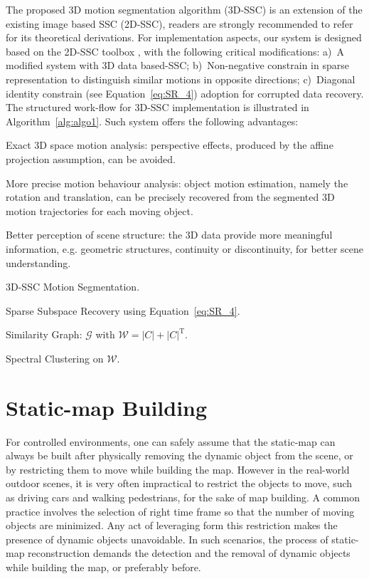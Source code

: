 \documentclass[10pt,twocolumn,letterpaper]{article}  %
\begin{document}
The proposed 3D motion segmentation algorithm (3D-SSC) is an extension of the existing image based SSC (2D-SSC), readers are strongly recommended to refer \cite{c2} for its theoretical derivations. For implementation aspects, our system is designed based on the 2D-SSC toolbox \cite{c2}, with the following critical modifications: a)~A modified system with 3D data based-SSC; b)~Non-negative constrain in sparse representation to distinguish similar motions in opposite directions; c)~Diagonal identity constrain (see Equation~\eqref{eq:SR_4}) adoption for corrupted data recovery. The structured work-flow for 3D-SSC implementation is illustrated in Algorithm~\ref{alg:algo1}. Such system offers the following advantages: 
\begin{list}{}{\leftmargin=1em}
\item Exact 3D space motion analysis: perspective effects, produced by the affine projection assumption, can be avoided.
\item More precise motion behaviour analysis: object motion estimation, namely the rotation and translation, can be precisely recovered from the segmented 3D motion trajectories for each moving object.
\item Better perception of scene structure: the 3D data provide more meaningful information, e.g. geometric structures, continuity or discontinuity, for better scene understanding.
\end{list}
\begin{algorithm}
 \caption{3D-SSC Motion Segmentation.}
 \label{alg:algo1}
 Sparse Subspace Recovery using Equation~\eqref{eq:SR_4}.
 
 Similarity Graph: $\mathcal{G}$ with $\mathcal{W} =  |C| + {|C|}^\text{T}$.
 
 Spectral Clustering on $\mathcal{W}$.

\end{algorithm}




\section{Static-map Building}
For controlled environments, one can safely assume that the static-map can always be built after physically removing the dynamic object from the scene, or by restricting them to move while building the map. However in the real-world outdoor scenes, it is very often impractical to restrict the objects to move, such as driving cars and walking pedestrians, for the sake of map building. A common practice  involves the selection of right time frame so that the number of moving objects are minimized. Any act of leveraging form this restriction makes the presence of dynamic objects unavoidable. In such scenarios, the process of static-map reconstruction demands the detection and the removal of dynamic objects while building the map, or preferably before.
\end{document}
